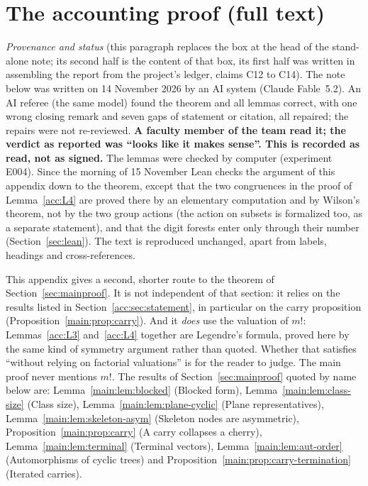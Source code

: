 \documentclass[11pt]{article}
\theoremstyle{definition}
\theoremstyle{remark}
\numberwithin{equation}{section}
\numberwithin{figure}{section}
\begin{document}
\section{The accounting proof (full text)}\label{app:acc}
\noindent\emph{Provenance and status} (this paragraph replaces the box at the head of the stand-alone note; its
second half is the content of that box, its first half was written in assembling the report from the
project's ledger, claims C12 to C14). The note below was written on 14 November 2026 by an AI system (Claude
Fable~5.2). An AI referee (the same model) found the theorem and all lemmas correct, with one wrong closing
remark and seven gaps of statement or citation, all repaired; the repairs were not re-reviewed.
\textbf{A faculty member of the team read it; the verdict as reported was ``looks like it makes sense''. This
is recorded as read, not as signed.} The lemmas were checked by computer (experiment E004). Since the morning
of 15 November Lean checks the argument of this appendix down to the theorem, except that the two congruences
in the proof of Lemma~\ref{acc:L4} are proved there by an elementary computation and by Wilson's theorem, not
by the two group actions (the action on subsets is formalized too, as a separate statement), and that the
digit forests enter only through their number
(Section~\ref{sec:lean}). The text is reproduced unchanged, apart from labels,
headings and cross-references.

\smallskip\noindent
This appendix gives a second, shorter route to the theorem of Section~\ref{sec:mainproof}. It is not
independent of that section: it relies on the results listed in Section~\ref{acc:sec:statement}, in
particular on the carry proposition (Proposition~\ref{main:prop:carry}). And it \emph{does} use the valuation
of $m!$: Lemmas~\ref{acc:L3} and~\ref{acc:L4} together are Legendre's formula, proved here by the same kind of
symmetry argument rather than quoted. Whether that satisfies ``without relying on factorial valuations'' is
for the reader to judge. The main proof never mentions $m!$. The results of Section~\ref{sec:mainproof}
quoted by name below are: Lemma~\ref{main:lem:blocked} (Blocked form), Lemma~\ref{main:lem:class-size} (Class
size), Lemma~\ref{main:lem:plane-cyclic} (Plane representatives), Lemma~\ref{main:lem:skeleton-asym} (Skeleton
nodes are asymmetric), Proposition~\ref{main:prop:carry} (A carry collapses a cherry),
Lemma~\ref{main:lem:terminal} (Terminal vectors), Lemma~\ref{main:lem:aut-order} (Automorphisms of cyclic
trees) and Proposition~\ref{main:prop:carry-termination} (Iterated carries).
\end{document}

